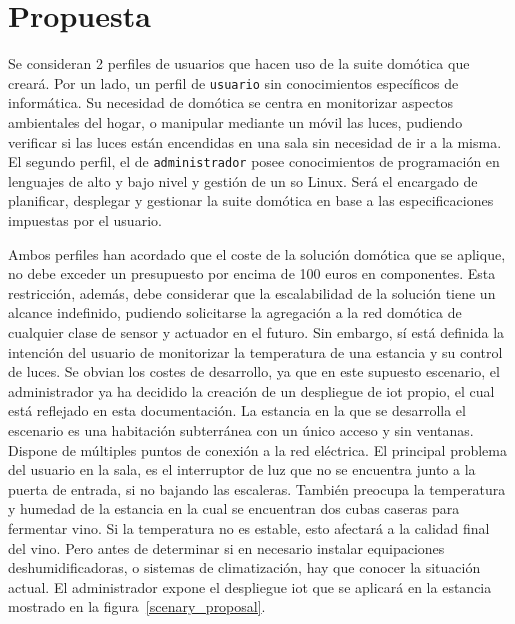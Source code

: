 \cleardoublepage

\chapter{Propuesta}
\label{ch:Capitulo3}

Se consideran 2 perfiles de usuarios que hacen uso de la suite domótica que creará. Por un lado, un  perfil de \verb|usuario| sin conocimientos específicos de informática. Su necesidad de domótica se centra en monitorizar aspectos ambientales del hogar, o manipular mediante un móvil las luces, pudiendo verificar si las luces están encendidas en una sala sin necesidad de ir a la misma. El segundo perfil, el de \verb|administrador| posee conocimientos de programación en lenguajes de alto y bajo nivel y gestión de un \gls{so} Linux. Será el encargado de planificar, desplegar y gestionar la suite domótica en base a las especificaciones impuestas por el usuario.

\vspace{1cm}

Ambos perfiles han acordado que el coste de la solución domótica que se aplique, no debe exceder un presupuesto por encima de 100 euros en componentes. Esta restricción, además, debe considerar que la escalabilidad de la solución tiene un alcance indefinido, pudiendo solicitarse la agregación a la red domótica de cualquier clase de sensor y actuador en el futuro. Sin embargo, sí está definida la intención del usuario de monitorizar la temperatura de una estancia y su control de luces. Se obvian los costes de desarrollo, ya que en este supuesto escenario, el administrador ya ha decidido la creación de un despliegue de \gls{iot} propio, el cual está reflejado en esta documentación. La estancia en la que se desarrolla el escenario es una habitación subterránea con un único acceso y sin ventanas. Dispone de múltiples puntos de conexión a la red eléctrica. El principal problema del usuario en la sala, es el interruptor de luz que no se encuentra junto a la puerta de entrada, si no bajando las escaleras. También preocupa la temperatura y humedad de la estancia en la cual se encuentran dos cubas caseras para fermentar vino. Si la temperatura no es estable, esto afectará a la calidad final del vino. Pero antes de determinar si en necesario instalar equipaciones deshumidificadoras, o sistemas de climatización, hay que conocer la situación actual. El administrador expone el despliegue \gls{iot} que se aplicará en la estancia mostrado en la figura~\ref{scenary_proposal}.

